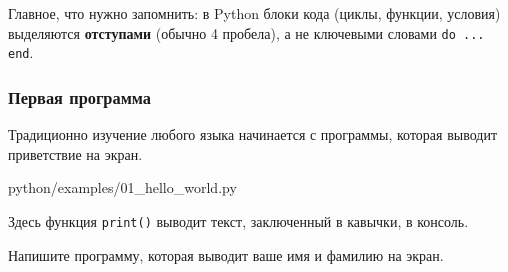 \begin{infobox}
Главное, что нужно запомнить: в Python блоки кода (циклы, функции, условия) выделяются \textbf{отступами} (обычно 4 пробела), а не ключевыми словами \texttt{do ... end}.
\end{infobox}

\subsubsection*{Первая программа}
Традиционно изучение любого языка начинается с программы, которая выводит приветствие на экран.

\begin{codefile}[python]{python/examples/01_hello_world.py}
\end{codefile}

Здесь функция \texttt{print()} выводит текст, заключенный в кавычки, в консоль.

\begin{taskbox}
Напишите программу, которая выводит ваше имя и фамилию на экран.
\end{taskbox}
